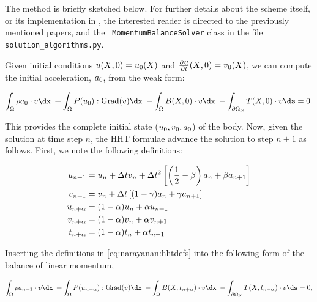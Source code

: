 The method is briefly sketched below. For further details about the
scheme itself, or its implementation in \twist, the interested reader
is directed to the previously mentioned papers, and the {\tt
MomentumBalanceSolver} class in the file {\tt
solution\_algorithms.py}.

Given initial conditions $\mbox{$ u$}(\mbox{$ X$}, 0) = \mbox{$ u$}_{0}(\mbox{$ X$})$ and
$\frac{\partial\mbox{$ u$}}{\partial t}(\mbox{$ X$}, 0) = \mbox{$ v$}_{0}(\mbox{$ X$})$, we can
compute the initial acceleration, $\mbox{$ a$}_{0}$, from the weak form:

\begin{equation}
  \int_{\Omega} \rho a_{0} \cdot \bv \dx\; +  \int_{\Omega}
\bP(u_{0}):\mathrm{Grad}(\bv) \dx\; - \int_{\Omega} \bB(X, 0)
\cdot \bv \dx\; -  \int_{\partial\Omega_{\mathrm{N}}}
\bT(X, 0) \cdot \bv \ds = 0.
\end{equation}

\noindent This provides the complete initial state ($\mbox{$ u$}_{0}, \mbox{$ v$}_{0},
\mbox{$ a$}_{0}$) of the body. Now, given the solution at time step $n$, the HHT
formulae advance the solution to step $n+1$ as follows. First, we note
the following definitions:

\begin{equation}
\begin{split}
\mbox{$ u$}_{n+1} & = \mbox{$ u$}_{n} + \Delta t \mbox{$ v$}_{n} + \Delta t^{2} \left[
  \left(\frac{1}{2} - \beta \right) \mbox{$ a$}_{n} + \beta \mbox{$ a$}_{n+1}
\right]\\
\mbox{$ v$}_{n+1} & = \mbox{$ v$}_{n} + \Delta t \left[ (1-\gamma) \mbox{$ a$}_{n} + \gamma
  \mbox{$ a$}_{n+1} \right]\\
\mbox{$ u$}_{n+\alpha} & = (1 - \alpha) \mbox{$ u$}_{n} + \alpha \mbox{$ u$}_{n+1}\\
\mbox{$ v$}_{n+\alpha} & = (1 - \alpha) \mbox{$ v$}_{n} + \alpha \mbox{$ v$}_{n+1}\\
t_{n+\alpha} &= (1 - \alpha) t_{n} + \alpha t_{n + 1}
\end{split}
\label{eq:narayanan:hhtdefs}
\end{equation}

\noindent Inserting the definitions in \eqref{eq:narayanan:hhtdefs}
into the following form of the balance of linear momentum,

\begin{equation}
   \int_{\Omega} \rho a_{n+1} \cdot \bv \dx\; + \int_{\Omega} \bP(u_{n
+ \alpha}):\mathrm{Grad}(\bv) \dx\; - \int_{\Omega} \bB(X, t_{n +
\alpha}) \cdot \bv \dx\; - \int_{\partial\Omega_{\mathrm{N}}} \bT(X,
t_{n + \alpha}) \cdot \bv \ds = 0,
\label{eq:narayanan:newaccn}
\end{equation}

